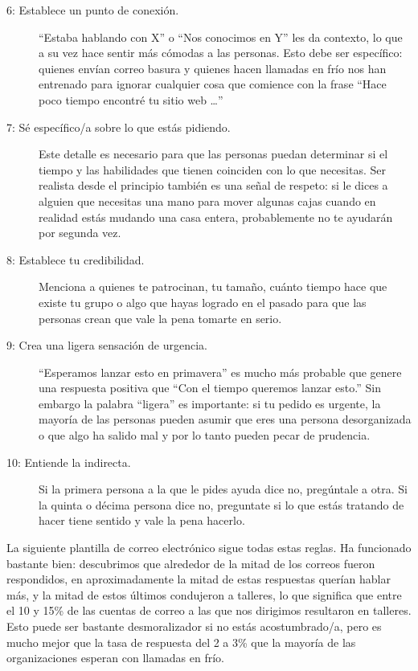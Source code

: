 \begin{description}
\item[6: Establece un punto de conexión.]
``Estaba hablando con X'' o ``Nos conocimos en Y'' les da contexto,
lo que a su vez hace sentir más cómodas a las personas.
Esto debe ser específico:
quienes envían correo basura y quienes hacen llamadas en frío
nos han entrenado para ignorar cualquier cosa que comience con la frase
``Hace poco tiempo encontré tu sitio web {\ldots}''

\item[7: Sé específico/a sobre lo que estás pidiendo.]
Este detalle es necesario para que las personas
puedan determinar si el tiempo y las habilidades que tienen
coinciden con lo que necesitas.
Ser realista desde el principio también es una señal de respeto:
 si le dices a alguien que necesitas una mano para mover algunas cajas 
 cuando en realidad estás mudando una casa entera,
 probablemente no te ayudarán por segunda vez.

\item[8: Establece tu credibilidad.]
Menciona a quienes te patrocinan,
tu tamaño,
cuánto tiempo hace que existe tu grupo o algo que hayas logrado en el pasado
para que las personas crean que vale la pena tomarte en serio.

\item[9: Crea una ligera sensación de urgencia.]
``Esperamos lanzar esto en primavera'' es mucho más probable que genere una respuesta positiva 
que ``Con el tiempo queremos lanzar esto.''
Sin embargo la palabra ``ligera'' es importante:
si tu pedido es urgente, 
la mayoría de las personas pueden asumir que eres una persona desorganizada 
o que algo ha salido mal
y por lo tanto pueden pecar de prudencia.

\item[10: Entiende la indirecta.]
Si la primera persona a la que le pides ayuda dice no,
pregúntale a otra.
Si la quinta o décima persona dice no,
preguntate si lo que estás tratando de hacer tiene sentido y vale la pena hacerlo.
\end{description}

La siguiente plantilla de correo electrónico sigue todas estas reglas.
Ha funcionado bastante bien:
descubrimos que alrededor de la mitad de los correos fueron respondidos, en
aproximadamente  la mitad de estas respuestas querían hablar más,
y la mitad de estos últimos condujeron a talleres,
lo que significa que entre el 10 y 15\% de las cuentas de correo a las que nos dirigimos resultaron en talleres.
Esto puede ser bastante desmoralizador si no estás acostumbrado/a, 
pero es mucho mejor que la tasa de respuesta del 2 a 3\% que la mayoría de las organizaciones esperan con llamadas en frío.

